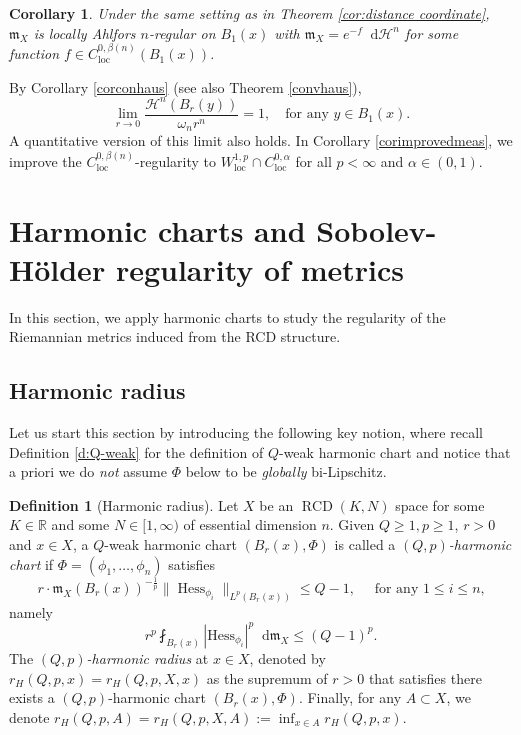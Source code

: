 \documentclass[11pt,reqno]{amsart}
\newtheorem{corollary}[theorem]{Corollary}
\theoremstyle{definition}
\newtheorem{definition}[theorem]{Definition}
\numberwithin{equation}{section}
\newcommand{\di}{\mathop{}\!\mathrm{d}}
\newcommand{\meas}{\mathfrak{m}}
\DeclareMathOperator{\Hess}{Hess}
\DeclareMathOperator{\loc}{loc}
\DeclareMathOperator{\RCD}{RCD}
\newcommand{\haus}{\mathscr{H}}
\begin{document}
\begin{corollary}\label{c:hoelder-measure-density}
    Under the same setting as in Theorem \ref{cor:distance coordinate}, $\meas_X$ is locally Ahlfors $n$-regular on $B_1(x)$ with
    $
        \meas_X=e^{-f}\di \haus^n
    $
    for some function $f \in C^{0,\beta(n)}_{\loc} (B_1(x))$.
\end{corollary}
 By Corollary \ref{corconhaus} (see also Theorem \ref{convhaus}),   
 \begin{equation}\lim_{r\to 0}\frac{\haus^n(B_r(y))}{\omega_nr^n}=1, \quad  \text{for any $y \in B_1(x)$}.
 \end{equation}
 A quantitative version of this limit also holds. In Corollary \ref{corimprovedmeas}, we improve the  $C^{0,\beta(n)}_{\loc}$-regularity to   $W^{1,p}_{\loc}\cap C^{0,\alpha}_{\loc}$ for all $p<\infty$ and $\alpha \in (0,1)$.




 
\section{Harmonic charts and Sobolev-H\"older regularity of metrics}\label{harmonicrr}

In this section, we apply harmonic charts to study the regularity of the Riemannian metrics induced from the RCD structure. 


\subsection{Harmonic radius}

 Let us start this section by introducing the following key notion, where recall Definition \ref{d:Q-weak} for the definition of $Q$-weak harmonic chart and notice that a priori we do \textit{not} assume $\Phi$ below to be {\it globally} bi-Lipschitz. 
\begin{definition}[Harmonic radius]
Let $X$ be an $\RCD(K, N)$ space for some $K \in \mathbb{R}$ and some $N \in [1, \infty)$ of essential dimension $n$. Given $Q\ge 1, p \ge 1$, $r > 0$ and $x \in X$,  a $Q$-weak harmonic chart $(B_r(x), \Phi)$ is called a {\it  $(Q, p)$-harmonic chart} if $\Phi = (\phi_1 , \ldots, \phi_n)$ satisfies 
\begin{equation}\label{harmests}
r \cdot \meas_X (B_r(x))^{-\frac{1}{p}}\|\Hess_{\phi_i}\|_{L^p(B_r(x))}\le Q-1, \quad \text{ for any $1 \leq i \leq n$,}
\end{equation}
namely
\begin{equation}
    r^p\fint_{B_r(x)}|\mathrm{Hess}_{\phi_i}|^p\di \meas_X \le (Q-1)^p.
\end{equation}
The {\it  $(Q, p)$-harmonic radius} 
at $x \in X$, denoted by
$
r_H(Q, p, x)=r_H(Q, p, X, x)
$
as the supremum of $r>0$ that satisfies there exists a $(Q, p)$-harmonic chart $(B_r(x), \Phi)$.
Finally, for any $A \subset X$, we denote
$r_H(Q, p, A)=r_H(Q, p, X, 
A) := \inf_{x \in A}r_H(Q, p, x)$.
\end{definition}
\end{document}
